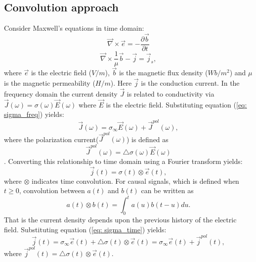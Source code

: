 \documentclass[a4paper, 11pt]{article}
\newcommand{\curl}{{\vec \nabla}\times}
\newcommand {\J}{{\vec J}}
\newcommand {\E}{{\vec E}}
\newcommand{\siginf}{\sigma_\infty}
\newcommand{\dsig}{\triangle\sigma}
\renewcommand {\j}  { {\vec j} }
\renewcommand {\b}  { {\vec b} }
\newcommand {\e}  { {\vec e} }
\begin{document}

\subsection{Convolution approach}
Consider Maxwell's equations in time domain:
\begin{equation}
  \curl{\e} = -\frac{\partial \b}{\partial t}
  \label{eq: total_farad}
\end{equation}
\begin{equation}
  \curl{\frac{1}{\mu}\b} - \j= \j_{s},
  \label{eq: total_coulomb}
\end{equation}
where $\e$ is the electric field ($V/m$), $\b$ is the magnetic flux density ($Wb/m^2$) and $\mu$ is the magnetic permeability ($H/m$). Here $\j$ is the conduction current. In the frequency domain the current density $\J$ is related to conductivity via $\J(\omega) = \sigma(\omega)\E(\omega)$ where $\E$ is the electric field. Substituting equation (\ref{eq: sigma_freq}) yields:
\begin{equation}
	\J(\omega) = \siginf\E(\omega)+\vec{J}^{pol}(\omega),
\end{equation}
where the polarization current($\J^{pol}(\omega)$) is defined as 
\begin{equation}
  \J^{pol}(\omega) = \dsig(\omega) \E(\omega)
\end{equation}.
Converting this relationship to time domain using a Fourier transform yields:
\begin{equation}
	\j(t) = \sigma(t)\otimes \e(t),
	\label{eq: ohmslaw1}
\end{equation}
where $\otimes$ indicates time convolution. For causal signals, which is defined when $t \ge 0$, convolution between $a(t)$ and $b(t)$ can be written as
\begin{equation}
	a(t) \otimes b(t) = \int_0^t a(u) b(t-u) du.
	\label{eq: convolution}
\end{equation}
That is the current density depends upon the previous history of the electric field. Substituting equation (\ref{eq: sigma_time}) yields:
\begin{equation}
	\j(t) = \siginf\e(t) + \dsig(t)\otimes\e(t) = \siginf\e(t) + \j^{pol}(t),
	\label{eq: ohmslaw2}
\end{equation}
where $\j^{pol}(t) = \dsig(t)\otimes\e(t)$.
\end{document}
